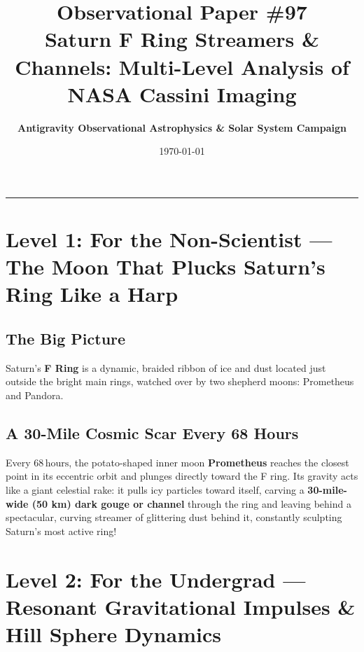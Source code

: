 \documentclass[11pt,a4paper]{article}
\title{\Huge \textbf{Observational Paper \#97}\\ \Large Saturn F Ring Streamers \& Channels: Multi-Level Analysis of NASA Cassini Imaging}
\author{\textbf{Antigravity Observational Astrophysics \& Solar System Campaign}}
\date{\today}
\begin{document}
\maketitle

\vspace{-1em}
\begin{center}
\rule{\textwidth}{1.5pt}
\end{center}

\section*{Level 1: For the Non-Scientist — The Moon That Plucks Saturn's Ring Like a Harp}

\subsection*{The Big Picture}
Saturn's \textbf{F Ring} is a dynamic, braided ribbon of ice and dust located just outside the bright main rings, watched over by two shepherd moons: Prometheus and Pandora.

\subsection*{A 30-Mile Cosmic Scar Every 68 Hours}
Every $68\,\text{hours}$, the potato-shaped inner moon \textbf{Prometheus} reaches the closest point in its eccentric orbit and plunges directly toward the F ring. Its gravity acts like a giant celestial rake: it pulls icy particles toward itself, carving a \textbf{30-mile-wide (50 km) dark gouge or channel} through the ring and leaving behind a spectacular, curving streamer of glittering dust behind it, constantly sculpting Saturn's most active ring!

\newpage

\section*{Level 2: For the Undergrad — Resonant Gravitational Impulses \& Hill Sphere Dynamics}
\end{document}
